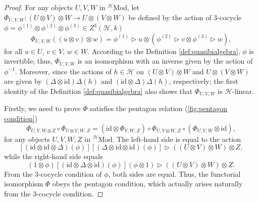 \documentclass[reqno]{amsart}
\theoremstyle{definition}
\theoremstyle{remark}
\begin{document}
\begin{proof}
    For any objects $U,V,W$ in $^{\mathscr{H}}\text{Mod}$, let $\Phi_{U,V,W}:(U\otimes V)\otimes W \longrightarrow U\otimes (V\otimes W)$ be defined by the action of 3-cocycle $\phi= \phi^{(1)}\otimes \phi^{(2)}\otimes \phi^{(3)} \in Z^3\left(\mathscr{H},k\right) $
    \begin{equation}
        \Phi_{U,V,W} \left((u\otimes v)\otimes w \right) = \phi^{(1)}\triangleright u \otimes \left(\phi^{(2)}\triangleright v \otimes \phi^{(3)}\triangleright w\right),
    \end{equation}
    for all $u\in U$, $v\in V$, $w\in W$. According to the Definition \ref{def:quasibialgebra}, $\phi$ is invertible; thus, $\Phi_{U,V,W}$ is an isomorphism with an inverse given by the action of $\phi^{-1}$. Moreover, since the actions of $h \in \mathscr{H}$ on $(U\otimes V)\otimes W$ and $U\otimes (V\otimes W)$ are given by $(\Delta \otimes \text{id})\Delta(h)$ and $(\text{id}\otimes \Delta)\Delta(h)$, respectively; the first identity of the Definition \ref{def:quasibialgebra} also shows that $\Phi_{U,V,W}$ is $\mathscr{H}$-linear. 
    
    Firstly, we need to prove $\Phi$ satisfies the pentagon relation (\ref{fig:pentagon condition})
    \begin{equation}
        \Phi_{U,V,W\otimes Z} \circ \Phi_{U\otimes V,W, Z} = \left(\text{id}\otimes \Phi_{V,W,Z}\right)\circ \Phi_{U,V\otimes W,Z} \circ \left(\Phi_{U,V,W}\otimes \text{id}\right), 
    \end{equation}
    for any objects $U,V,W,Z$ in $^{\mathscr{H}}\text{Mod}$. The left-hand side is equal to the action 
    \begin{equation}
        \left[ {\left( {\textrm{id} \otimes \textrm{id} \otimes \Delta } \right)\left( \phi  \right)} \right]\left[ {\left( {\Delta  \otimes \textrm{id} \otimes \textrm{id}} \right)\left( \phi  \right)} \right] \triangleright ((U\otimes V)\otimes W)\otimes Z,
    \end{equation}
    while the right-hand side equals
    \begin{equation}
        \left( {1 \otimes \phi } \right)\left[ {\left( {\textrm{id} \otimes \Delta  \otimes \textrm{id}} \right)\left( \phi  \right)} \right]\left( {\phi  \otimes 1} \right) \triangleright ((U\otimes V)\otimes W)\otimes Z.
    \end{equation}
    From the 3-cocycle condition of $\phi$, both sides are equal. Thus, the functorial isomorphism $\Phi$ obeys the pentagon condition, which actually arises naturally from the 3-cocycle condition.


\end{proof}
\end{document}
